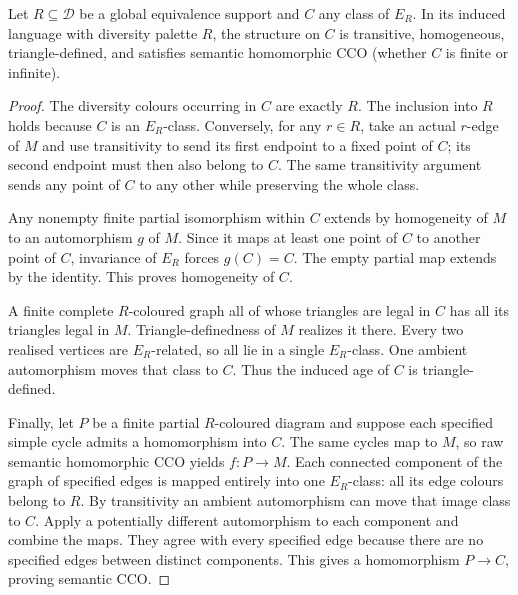 \begin{lemma}
\label{lem:rh-class-inherits}
Let $R\subseteq\mathcal D$ be a global equivalence support and $C$
any class of $E_R$. In its induced language with diversity palette
$R$, the structure on $C$ is transitive, homogeneous, triangle-defined,
and satisfies semantic homomorphic CCO (whether $C$ is finite or
infinite).
\end{lemma}
\begin{proof}
The diversity colours occurring in $C$ are exactly $R$. The inclusion
into $R$ holds because $C$ is an $E_R$-class. Conversely, for any
$r\in R$, take an actual $r$-edge of $M$ and use transitivity to send
its first endpoint to a fixed point of $C$; its second endpoint must
then also belong to $C$. The same transitivity argument sends any
point of $C$ to any other while preserving the whole class.

Any nonempty finite partial isomorphism within $C$ extends by
homogeneity of $M$ to an automorphism $g$ of $M$. Since it maps at
least one point of $C$ to another point of $C$, invariance of $E_R$
forces $g(C)=C$. The empty partial map extends by the identity.
This proves homogeneity of $C$.

A finite complete $R$-coloured graph all of whose triangles are legal
in $C$ has all its triangles legal in $M$. Triangle-definedness of
$M$ realizes it there. Every two realised vertices are $E_R$-related,
so all lie in a single $E_R$-class. One ambient automorphism moves
that class to $C$. Thus the induced age of $C$ is triangle-defined.

Finally, let $P$ be a finite partial $R$-coloured diagram and suppose
each specified simple cycle admits a homomorphism into $C$.
The same cycles map to $M$, so raw semantic homomorphic CCO yields
$f:P\to M$. Each connected component of the graph of specified
edges is mapped entirely into one $E_R$-class: all its edge colours
belong to $R$. By transitivity an ambient automorphism can move
that image class to $C$. Apply a potentially different automorphism
to each component and combine the maps. They agree with every
specified edge because there are no specified edges between distinct
components. This gives a homomorphism $P\to C$, proving semantic CCO.
\end{proof}

